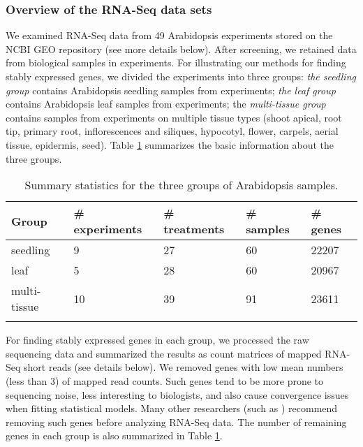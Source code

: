 	\subsubsection*{Overview of the RNA-Seq data sets}
	We examined RNA-Seq data from 49 Arabidopsis experiments stored on the NCBI
	GEO repository (see more details below). After screening, we retained data
	from \howmanySamples biological samples in \howmanylab experiments.  For illustrating our methods
	for finding stably expressed genes, we divided the experiments into three
	groups: \textit{the seedling group} contains \howmanyseedlingsample Arabidopsis seedling samples
	from \howmanyseedlingexperiment experiments; \textit{ the leaf group} contains \howmanyleafsample Arabidopsis leaf
	samples from \howmanyleafexperiment experiments;  the \textit{multi-tissue group} contains \howmanytissuesample
	samples from \howmanytissueexperiment experiments on multiple tissue types (shoot apical, root tip,
	primary root, inflorescences and siliques, hypocotyl, flower, carpels, aerial
	tissue, epidermis, seed).  Table \ref{table:TableSet3} summarizes the basic information about
	the three groups.
	\begin{table}[!ht]
		\centering
		\caption{Summary statistics for the three groups of Arabidopsis samples.}
		\begin{tabular}{lp{2.4cm}p{2.3cm}p{2cm}p{1.5cm}} \hline
			Group & \#  experiments & \# treatments  & \# samples & \# genes \\ \hline
			seedling &   9 &  27 &  60 & 22207 \\ 
			leaf &   5 &  28 &  60 & 20967 \\ 
			multi-tissue &  10 &  39 &  91 & 23611 \\ \hline
			\label{table:TableSet3}
		\end{tabular}
	\end{table}
	
	For finding stably expressed genes in each group, we processed the raw
	sequencing data and summarized the results as count matrices of mapped RNA-Seq
	short reads (see details below).  We removed genes with low mean numbers (less
	than 3) of mapped read counts.  Such genes tend to be more prone to sequencing
	noise, less interesting to biologists, and also cause convergence issues when
	fitting statistical models. Many other researchers (such as \citealt{anders2013count})
	recommend removing such genes before analyzing RNA-Seq data.  The number of
	remaining genes in each group is also summarized in Table
	\ref{table:TableSet3}.
	
